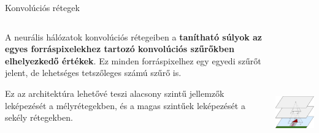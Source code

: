 \documentclass[english, aspectratio=169]{beamer}
\begin{document}
\begin{frame}{Konvolúciós rétegek}
\begin{columns}
\begin{column}{.5\textwidth}
A neurális hálózatok konvolúciós rétegeiben a \textbf{tanítható súlyok az egyes forráspixelekhez tartozó konvolúciós szűrőkben elhelyezkedő értékek}. Ez minden forráspixelhez egy egyedi szűrőt jelent, de lehetséges tetszőleges számú szűrő is.\par\smallskip
Ez az architektúra lehetővé teszi alacsony szintű jellemzők leképezését a mélyrétegekben, és a magas szintűek leképezését a sekély rétegekben.
\end{column}
\begin{column}{.5\textwidth}
\begin{center}
\includegraphics[width=6cm, height=7cm, keepaspectratio]{images/neural_11.png}
\end{center}
\end{column}
\end{columns}
\end{frame}
\end{document}
